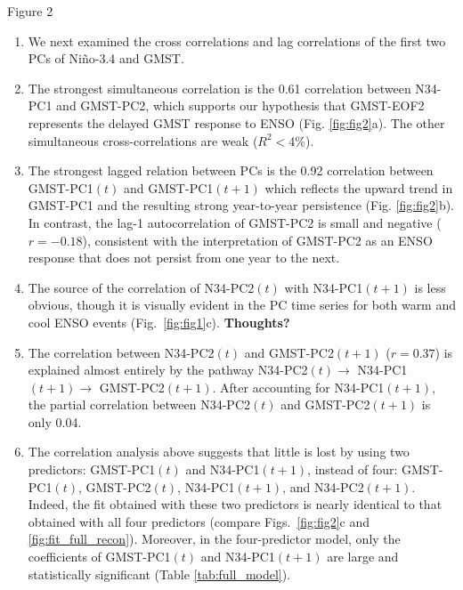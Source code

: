 \documentclass[aspectratio=169,xcolor=dvipsnames]{beamer}
\begin{document}
\begin{frame}{Figure 2}
  \begin{enumerate}\scriptsize
  \item We next examined the cross correlations and lag correlations of
    the first two PCs of Ni\~no-3.4 and GMST.
  
  \item The strongest simultaneous correlation is the 0.61 correlation
    between N34-PC1 and GMST-PC2, which supports our hypothesis that
    GMST-EOF2 represents the delayed GMST response to ENSO
    (Fig. \ref{fig:fig2}a). The other simultaneous cross-correlations are
    weak ($R^2 < 4\%$).
  
  \item The strongest lagged relation between PCs is the 0.92
    correlation between GMST-PC1$(t)$ and GMST-PC1$(t+1)$ which
    reflects the upward trend in GMST-PC1 and the resulting strong
    year-to-year persistence (Fig. \ref{fig:fig2}b).  In contrast, the
    lag-1 autocorrelation of GMST-PC2 is small and negative
    ($r=-0.18$), consistent with the interpretation of GMST-PC2 as an
    ENSO response that does not persist from one year to the next.
    
  \item The source of the correlation of N34-PC2$(t)$ with
    N34-PC1$(t+1)$ is less obvious, though it is visually evident in
    the PC time series for both warm and cool ENSO events (Fig.\
    \ref{fig:fig1}c). \textbf{Thoughts?}

  \item The correlation between N34-PC2$(t)$ and GMST-PC2$(t+1)$
    ($r=0.37$) is explained almost entirely by the pathway
    N34-PC2$(t) \rightarrow$ N34-PC1$(t+1) \rightarrow$
    GMST-PC2$(t+1)$. After accounting for N34-PC1$(t+1)$, the partial
    correlation between N34-PC2$(t)$ and GMST-PC2$(t+1)$ is only 0.04.
     
  \item The correlation analysis above suggests that little is lost by
    using two predictors: GMST-PC1$(t)$ and N34-PC1$(t+1)$, instead of
    four: GMST-PC1$(t)$, GMST-PC2$(t)$, N34-PC1$(t+1)$, and
    N34-PC2$(t+1)$. Indeed, the fit obtained with these two predictors
    is nearly identical to that obtained with all four predictors
    (compare Figs.\ \ref{fig:fig2}c and
    \ref{fig:fit_full_recon}). Moreover, in the four-predictor model,
    only the coefficients of GMST-PC1$(t)$ and N34-PC1$(t+1)$ are
    large and statistically significant (Table \ref{tab:full_model}).

  \end{enumerate}
\end{frame}
\end{document}
